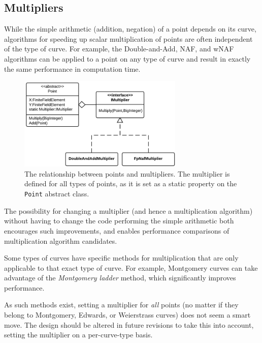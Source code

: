 \subsection{Multipliers}
\label{sec:implementation_multipliers}
\label{sec:implementation_multiplication}

While the simple arithmetic (addition, negation) of a point depends on its curve, algorithms for speeding up scalar
multiplication of points are often independent of the type of curve. For example, the Double-and-Add, NAF, and wNAF
algorithms can be applied to a point on any type of curve and result in exactly the same performance in computation
time.

\begin{figure}[htb]
	\centering
	\includegraphics[width=0.7\textwidth]{implementation/multipliers}
	\caption{The relationship between points and multipliers. The multiplier is defined for all types of points, as it
		is set as a static property on the \texttt{Point} abstract class.}
\end{figure}

The possibility for changing a multiplier (and hence a multiplication algorithm) without having to change the code
performing the simple arithmetic both encourages such improvements, and enables performance comparisons of multiplication
algorithm candidates.

Some types of curves have specific methods for multiplication that are only applicable to that exact type of curve. For
example, Montgomery curves can take advantage of the \emph{Montgomery ladder} method, which significantly improves
performance.\cite{safecurves}

As such methods exist, setting a multiplier for \emph{all} points (no matter if they belong to Montgomery, Edwards, or
Weierstrass curves) does not seem a smart move. The design should be altered in future revisions to take this into account,
setting the multiplier on a per-curve-type basis.